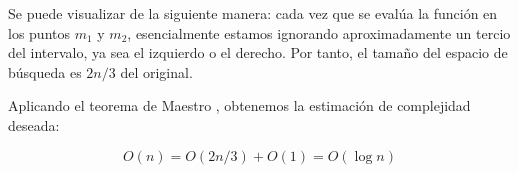 Se puede visualizar de la siguiente manera: cada vez que se evalúa la función en los 
puntos $m_1$ y $m_2$, esencialmente estamos ignorando aproximadamente un tercio del 
intervalo, ya sea el izquierdo o el derecho. Por tanto, el tamaño del espacio de 
búsqueda es ${2n}/{3}$ del original.

Aplicando el teorema de Maestro , obtenemos la estimación de complejidad deseada:

$$O(n) = O({2n}/{3}) + O(1) = O(\log n)$$
